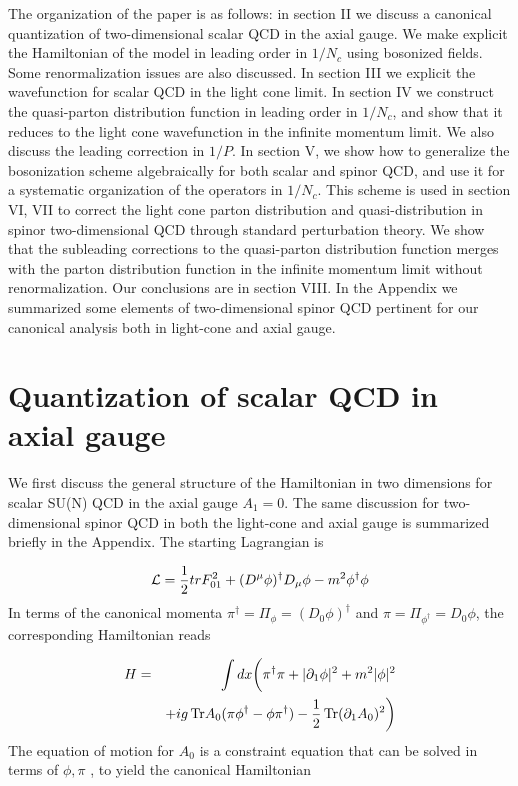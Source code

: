 \documentclass[showpacs,twocolumn,aps,preprintnumbers,letterpaper]{revtex4}
\newcommand{\be}{\begin{equation}}
\newcommand{\ee}{\end{equation}}
\def\be{\begin{eqnarray}}
\def\ee{\end{eqnarray}}
\begin{document}
The organization of the paper is as follows: in section II we discuss a canonical quantization of
two-dimensional scalar QCD in the axial gauge. We make explicit the Hamiltonian  of the model in leading
order in $1/N_c$ using bosonized fields. Some renormalization issues are also discussed. 
In section III we explicit the wavefunction for scalar QCD in the light cone limit. 
In section IV we construct the quasi-parton distribution function in leading order in $1/N_c$, and show that
it reduces to the light cone wavefunction in the infinite momentum limit. 
We also discuss the leading  correction in $1/P$.  In section V, we show how to generalize
the bosonization scheme algebraically for both scalar and spinor QCD, and use it for a systematic
organization of the operators in $1/N_c$. This scheme is used 
in section VI, VII to correct
the light cone parton distribution and quasi-distribution  in spinor two-dimensional QCD through standard
perturbation theory. We show that  the subleading  corrections to the quasi-parton distribution function merges with the parton distribution function in the infinite momentum limit without renormalization. Our conclusions are in section VIII.
In the Appendix we summarized some elements of two-dimensional spinor QCD pertinent for our
canonical analysis both in light-cone and axial gauge.






\section{Quantization of scalar QCD in axial gauge}

We first discuss the general structure of the Hamiltonian in two dimensions for
scalar SU(N) QCD in the axial gauge $A_1=0$. The same discussion for two-dimensional
spinor QCD in both the light-cone and axial gauge is summarized briefly in the Appendix. 
The starting Lagrangian is


\be
\label{1}
{\cal L}=\frac{1}{2}tr F_{01}^2+(D^{\mu}\phi )^{\dagger}D_{\mu}\phi-m^2\phi^{\dagger}\phi
\ee
In terms of the canonical momenta $\pi^{\dagger}=\Pi_{\phi}=(D_0\phi)^{\dagger}$ and $\pi=\Pi_{\phi^{\dagger}}=D_0\phi$, 
the corresponding Hamiltonian reads


\be
\label{2}
H=&& \int dx \bigg(\pi^{\dagger}\pi+|\partial_1 \phi|^2+m^2|\phi|^2\nonumber \\
&&+ig\,{\rm Tr}A_0 (\pi \phi^{\dagger}-\phi \pi^{\dagger})-\frac{1}{2}\,{\rm Tr} (\partial_1 A_0)^2\bigg)
\ee
The equation of motion for $A_0$ is  a constraint equation that can be solved 
in terms of  $\phi, \pi$ , to yield the canonical Hamiltonian
\end{document}
